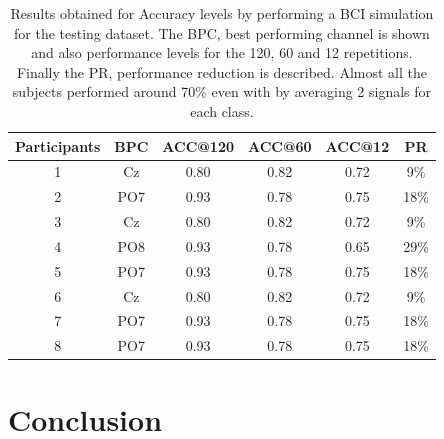 \documentclass[entropy,article,submit,moreauthors,pdftex,10pt,a4paper]{mdpi}
\begin{document}
\begin{table}[H]
\caption{Results obtained for Accuracy levels by performing a BCI simulation for the testing dataset. The BPC, best performing channel is shown and also performance levels for the 120, 60 and 12 repetitions. Finally the PR, performance reduction is described.  Almost all the subjects performed around 70\% even with by averaging 2 signals for each class.}
\centering
\begin{tabular}{cccccc}
\toprule
\textbf{Participants}	& \textbf{BPC}	& \textbf{ACC@120}	& \textbf{ACC@60}	&  \textbf{ACC@12} & \textbf{PR}\\
\midrule
1 & Cz &   0.80 &   0.82 &   0.72 & 9\% \\
2 & PO7 &   0.93 &   0.78 &   0.75 & 18\%\\
3 & Cz &   0.80 &   0.82 &   0.72 & 9\%\\
4 & PO8 &   0.93 &   0.78 &   0.65 & 29\%\\
5 & PO7 &   0.93 &   0.78 &   0.75 & 18\%\\
6 & Cz &   0.80 &   0.82 &   0.72 & 9\%\\
7 & PO7 &   0.93 &   0.78 &   0.75 & 18\%\\
8 & PO7 &   0.93 &   0.78 &   0.75 & 18\%\\
\bottomrule
\end{tabular}
\label{tab:singletrialreduction}
\end{table}

%
%
%
%
%
%


\section{Conclusion}
\end{document}
